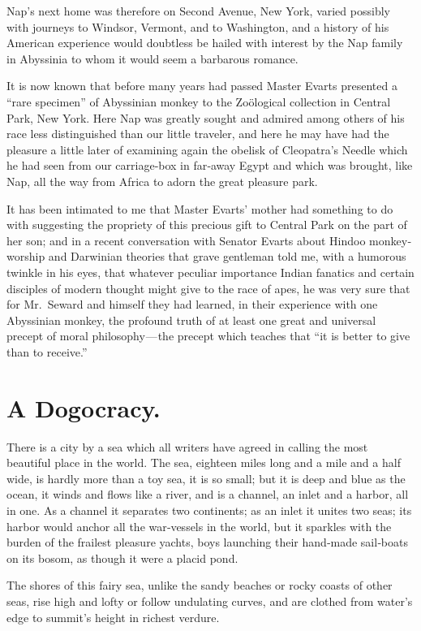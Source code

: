 \documentclass[12pt]{book}
\begin{document}
Nap’s next home was therefore on Second Avenue, New York, varied possibly
with journeys to Windsor, Vermont, and to Washington, and a history of his
American experience would doubtless be hailed with interest by the Nap family
in Abyssinia to whom it would seem a barbarous romance.

It is now known that before many years had passed Master Evarts presented
a “rare specimen” of Abyssinian monkey to the Zoölogical collection in Central
Park, New York. Here Nap was greatly sought and admired among others of
his race less distinguished than our little traveler, and here he may have had the
pleasure a little later of examining again the obelisk of Cleopatra’s Needle which
he had seen from our carriage‐box in far‐away Egypt and which was brought,
like Nap, all the way from Africa to adorn the great pleasure park.

It has been intimated to me that Master Evarts’ mother had something to
do with suggesting the propriety of this precious gift to Central Park on the
part of her son; and in a recent conversation with Senator Evarts about Hindoo
monkey‐worship and Darwinian theories that grave gentleman told me, with a
humorous twinkle in his eyes, that whatever peculiar importance Indian fanatics
and certain disciples of modern thought might give to the race of apes, he was very
sure that for Mr.~Seward and himself they had learned, in their experience with
one Abyssinian monkey, the profound truth of at least one great and universal
precept of moral philosophy — the precept which teaches that “it is better to give
than to receive.”

\chapter{A Dogocracy.}

There is a city by a sea which all writers have agreed in calling the most beautiful
place in the world. The sea, eighteen miles long and a mile and a half wide, is
hardly more than a toy sea, it is so small; but it is deep and blue as the ocean, it
winds and flows like a river, and is a channel, an inlet and a harbor, all in one. As
a channel it separates two continents; as an inlet it unites two seas; its harbor
would anchor all the war‐vessels in the world, but it sparkles with the burden
of the frailest pleasure yachts, boys launching their hand‐made sail‐boats on its
bosom, as though it were a placid pond.

The shores of this fairy sea, unlike the sandy beaches or rocky coasts of other
seas, rise high and lofty or follow undulating curves, and are clothed from water’s
edge to summit’s height in richest verdure.
\end{document}
